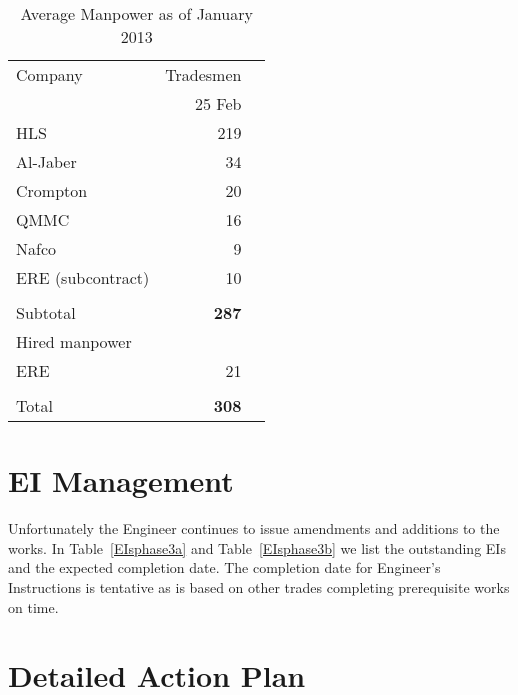 \def\Z{\phantom{Z}}
\begin{table}[htbp]
\begin{center}
\begin{tabular}{l r r}
\toprule
Company           &Tradesmen  \\
~                 &25 Feb \\
\midrule
HLS                &219         \\
Al-Jaber          &34         \\
Crompton        &20           \\
QMMC            &16        \\
Nafco             &9           \\
ERE (subcontract)               &10          \\
                 
                  &\underline{\phantom{1075}}\\
Subtotal          &\textbf{287}        \\

Hired manpower    &         \\
\Z ERE            &21        \\
          
                 
&&\\
Total                      &\textbf{308}       \\
                           
\bottomrule
\end{tabular}
\caption{Average Manpower as of January 2013}
\label{personnel}
\end{center}
\end{table}



\section*{EI Management}

Unfortunately the Engineer continues to issue amendments and additions to the works. In Table~\ref{EIsphase3a} and Table~\ref{EIsphase3b}  we list
the outstanding EIs and the expected completion date. The completion date for Engineer's Instructions is tentative as
is based on other trades completing prerequisite works on time.   
\bigskip



\section*{Detailed Action Plan}

